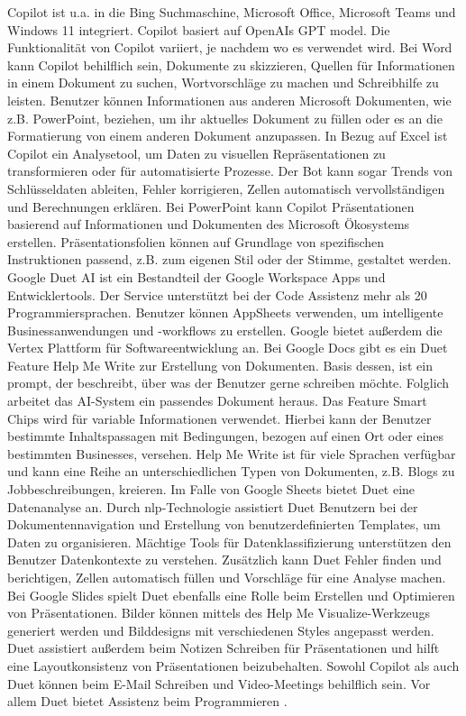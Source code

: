 Copilot ist u.a. in die Bing Suchmaschine, Microsoft Office, Microsoft Teams und Windows 11 integriert. Copilot basiert auf OpenAIs GPT model. Die Funktionalität von Copilot variiert, je nachdem wo es verwendet wird. Bei Word kann Copilot behilflich sein, Dokumente zu skizzieren, Quellen für Informationen in einem Dokument zu suchen, Wortvorschläge zu machen und Schreibhilfe zu leisten. Benutzer können Informationen aus anderen Microsoft Dokumenten, wie z.B. PowerPoint, beziehen, um ihr aktuelles Dokument zu füllen oder es an die Formatierung von einem anderen Dokument anzupassen. In Bezug auf Excel ist Copilot ein Analysetool, um Daten zu visuellen Repräsentationen zu transformieren oder für automatisierte Prozesse. Der Bot kann sogar Trends von Schlüsseldaten ableiten, Fehler korrigieren, Zellen automatisch vervollständigen und Berechnungen erklären. Bei PowerPoint kann Copilot Präsentationen basierend auf Informationen und Dokumenten des Microsoft Ökosystems erstellen. Präsentationsfolien können auf Grundlage von spezifischen Instruktionen passend, z.B. zum eigenen Stil oder der Stimme, gestaltet werden. Google Duet AI ist ein Bestandteil der Google Workspace Apps und Entwicklertools. Der Service unterstützt bei der Code Assistenz mehr als 20 Programmiersprachen. Benutzer können AppSheets verwenden, um intelligente Businessanwendungen und -workflows zu erstellen. Google bietet außerdem die Vertex Plattform für Softwareentwicklung an. Bei Google Docs gibt es ein Duet Feature Help Me Write zur Erstellung von Dokumenten. Basis dessen, ist ein prompt, der beschreibt, über was der Benutzer gerne schreiben möchte. Folglich arbeitet das AI-System ein passendes Dokument heraus. Das Feature Smart Chips wird für variable Informationen verwendet. Hierbei kann der Benutzer bestimmte Inhaltspassagen mit Bedingungen, bezogen auf einen Ort oder eines bestimmten Businesses, versehen. Help Me Write ist für viele Sprachen verfügbar und kann eine Reihe an unterschiedlichen Typen von Dokumenten, z.B. Blogs zu Jobbeschreibungen, kreieren. Im Falle von Google Sheets bietet Duet eine Datenanalyse an. Durch \gls{nlp}-Technologie assistiert Duet Benutzern bei der Dokumentennavigation und Erstellung von benutzerdefinierten Templates, um Daten zu organisieren. Mächtige Tools für Datenklassifizierung unterstützen den Benutzer Datenkontexte zu verstehen. Zusätzlich kann Duet Fehler finden und berichtigen, Zellen automatisch füllen und Vorschläge für eine Analyse machen. Bei Google Slides spielt Duet ebenfalls eine Rolle beim Erstellen und Optimieren von Präsentationen. Bilder können mittels des Help Me Visualize-Werkzeugs generiert werden und Bilddesigns mit verschiedenen Styles angepasst werden. Duet assistiert außerdem beim Notizen Schreiben für Präsentationen und hilft eine Layoutkonsistenz von Präsentationen beizubehalten. Sowohl Copilot als auch Duet können beim E-Mail Schreiben und Video-Meetings behilflich sein. Vor allem Duet bietet Assistenz beim Programmieren \cite{copilot-duet}. \\
